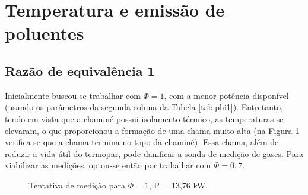\section{Temperatura e emissão de poluentes}

\subsection{Razão de equivalência 1}
Inicialmente buscou-se trabalhar com $\Phi = 1$, com a menor potência disponível (usando os parâmetros da segunda coluna da Tabela \ref{tab:phi1}). Entretanto, tendo em vista que a chaminé possui isolamento térmico, as temperaturas se elevaram, o que proporcionou a formação de uma chama muito alta (na Figura \ref{fig:demais} verifica-se que a chama termina no topo da chaminé). Essa chama, além de reduzir a vida útil do termopar, pode danificar a sonda de medição de gases. Para viabilizar as medições, optou-se então por trabalhar com $\Phi = 0,7$.

\begin{figure}[!ht]
	\centering
	\caption{Tentativa de medição para $\Phi = 1$, P = 13,76 kW.}
	\label{fig:demais}
\end{figure}

